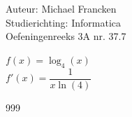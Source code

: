 \documentclass[a4paper]{article}
\begin{document}
\noindent \large Auteur: Michael Francken \\
\noindent \large Studierichting: Informatica\\
\noindent \large Oefeningenreeks 3A nr. 37.7\\

\medskip

\normalsize

$f(x)=\log_4(x)$\\

$f'(x)=\dfrac{1}{x\ln(4)}$\\



\begin{thebibliography}{999}
\end{thebibliography}
\end{document}
